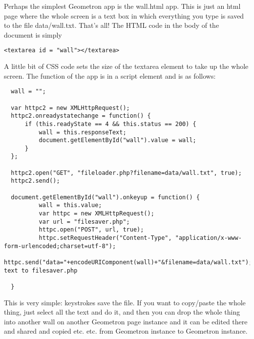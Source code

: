 Perhaps the simplest Geometron app is the wall.html app.  This is just an html page where the whole screen is a text box in which everything you type is saved to the file data/wall.txt.  That's all! The HTML code in the body of the document is simply 

\begin{verbatim}
<textarea id = "wall"></textarea>
\end{verbatim}

A little bit of CSS code sets the size of the textarea element to take up the whole screen. The function of the app is in a script element and is as follows:

\begin{verbatim}
  wall = "";

  var httpc2 = new XMLHttpRequest();
  httpc2.onreadystatechange = function() {
      if (this.readyState == 4 && this.status == 200) {
          wall = this.responseText;
          document.getElementById("wall").value = wall;
      }
  };
  
  httpc2.open("GET", "fileloader.php?filename=data/wall.txt", true);
  httpc2.send();
  
  document.getElementById("wall").onkeyup = function() {
          wall = this.value;
          var httpc = new XMLHttpRequest();
          var url = "filesaver.php";        
          httpc.open("POST", url, true);
          httpc.setRequestHeader("Content-Type", "application/x-www-form-urlencoded;charset=utf-8");
          httpc.send("data="+encodeURIComponent(wall)+"&filename=data/wall.txt");//send text to filesaver.php        
      
  }
\end{verbatim}

This is very simple: keystrokes save the file. If you want to copy/paste the whole thing, just select all the text and do it, and then you can drop the whole thing into another wall on another Geometron page instance and it can be edited there and shared and copied etc. etc. from Geometron instance to Geometron instance.  


